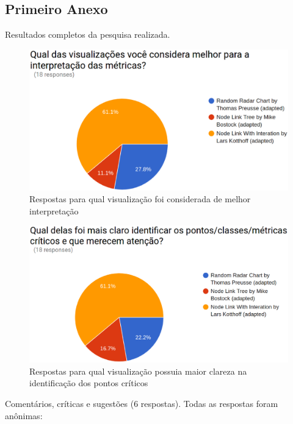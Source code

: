 \begin{anexosenv}

\partanexos

\chapter{Primeiro Anexo}
\label{chap:anexoA}

Resultados completos da pesquisa realizada.

\begin{figure}[!htb]
	\centering
    \includegraphics[keepaspectratio=true,scale=0.35]
    {figuras/res1.eps}
  \caption{Respostas para qual visualização foi considerada de melhor
  interpretação}
  \label{fig:res1}
\end{figure}

\begin{figure}[!htb]
	\centering
    \includegraphics[keepaspectratio=true,scale=0.35]
    {figuras/res2.eps}
  \caption{Respostas para qual visualização possuia maior clareza na
  identificação dos pontos críticos}
  \label{fig:res1}
\end{figure}

Comentários, críticas e sugestões (6 respostas). Todas as respostas foram
anônimas:


\end{anexosenv}
